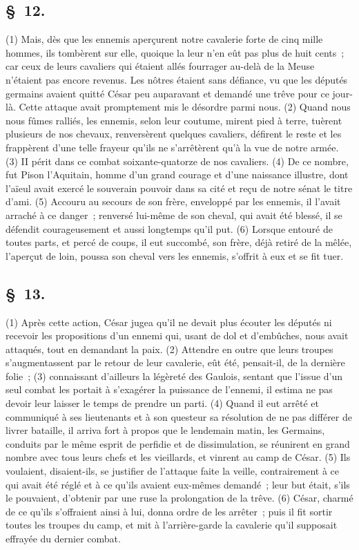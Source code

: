 \documentclass[french,twoside]{book} %
\begin{document}
\subsection[{§ 12.}]{ \textsc{§ 12.} }
\noindent (1) Mais, dès que les ennemis aperçurent notre cavalerie forte de cinq mille hommes, ils tombèrent sur elle, quoique la leur n’en eût pas plus de huit cents ; car ceux de leurs cavaliers qui étaient allés fourrager au-delà de la Meuse n’étaient pas encore revenus. Les nôtres étaient sans défiance, vu que les députés germains avaient quitté César peu auparavant et demandé une trêve pour ce jour-là. Cette attaque avait promptement mis le désordre parmi nous. (2) Quand nous nous fûmes ralliés, les ennemis, selon leur coutume, mirent pied à terre, tuèrent plusieurs de nos chevaux, renversèrent quelques cavaliers, défirent le reste et les frappèrent d’une telle frayeur qu’ils ne s’arrêtèrent qu’à la vue de notre armée. (3) II périt dans ce combat soixante-quatorze de nos cavaliers. (4) De ce nombre, fut Pison l’Aquitain, homme d’un grand courage et d’une naissance illustre, dont l’aïeul avait exercé le souverain pouvoir dans sa cité et reçu de notre sénat le titre d’ami. (5) Accouru au secours de son frère, enveloppé par les ennemis, il l’avait arraché à ce danger ; renversé lui-même de son cheval, qui avait été blessé, il se défendit courageusement et aussi longtemps qu’il put. (6) Lorsque entouré de toutes parts, et percé de coups, il eut succombé, son frère, déjà retiré de la mêlée, l’aperçut de loin, poussa son cheval vers les ennemis, s’offrit à eux et se fit tuer.
\subsection[{§ 13.}]{ \textsc{§ 13.} }
\noindent (1) Après cette action, César jugea qu’il ne devait plus écouter les députés ni recevoir les propositions d’un ennemi qui, usant de dol et d’embûches, nous avait attaqués, tout en demandant la paix. (2) Attendre en outre que leurs troupes s’augmentassent par le retour de leur cavalerie, eût été, pensait-il, de la dernière folie ; (3) connaissant d’ailleurs la légèreté des Gaulois, sentant que l’issue d’un seul combat les portait à s’exagérer la puissance de l’ennemi, il estima ne pas devoir leur laisser le temps de prendre un parti. (4) Quand il eut arrêté et communiqué à ses lieutenants et à son questeur sa résolution de ne pas différer de livrer bataille, il arriva fort à propos que le lendemain matin, les Germains, conduits par le même esprit de perfidie et de dissimulation, se réunirent en grand nombre avec tous leurs chefs et les vieillards, et vinrent au camp de César. (5) Ils voulaient, disaient-ils, se justifier de l’attaque faite la veille, contrairement à ce qui avait été réglé et à ce qu’ils avaient eux-mêmes demandé ; leur but était, s’ils le pouvaient, d’obtenir par une ruse la prolongation de la trêve. (6) César, charmé de ce qu’ils s’offraient ainsi à lui, donna ordre de les arrêter ; puis il fit sortir toutes les troupes du camp, et mit à l’arrière-garde la cavalerie qu’il supposait effrayée du dernier combat.
\end{document}
